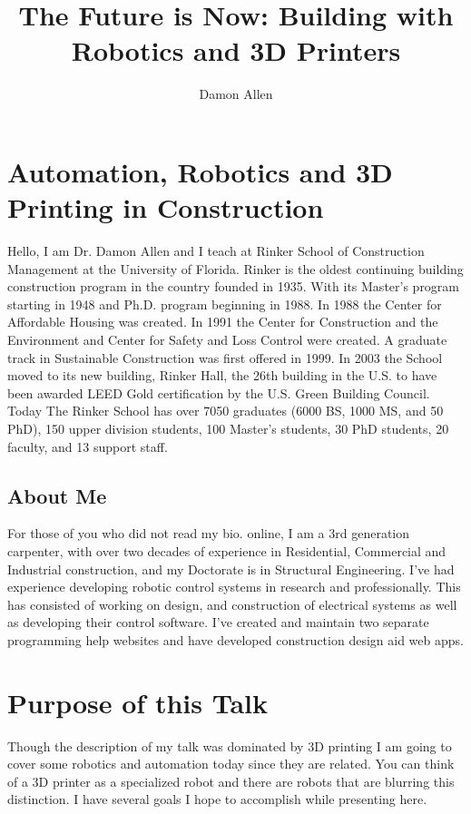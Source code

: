 \documentclass[12pt]{article}
\title{The Future is Now: Building with Robotics and 3D Printers}
\author{Damon Allen}
\begin{document}
\maketitle
\section{ Automation, Robotics and 3D Printing in Construction }
Hello, I am Dr. Damon Allen and I teach at Rinker School of Construction Management at the University of Florida.  Rinker is the oldest continuing building construction program in the country founded in 1935.   With its Master's program starting in 1948 and Ph.D. program beginning in 1988.  In 1988 the Center for Affordable Housing was created.  In 1991 the Center for Construction and the Environment and Center for Safety and Loss Control were created.  A graduate track in Sustainable Construction was first offered in 1999.  In 2003 the School moved to its new building, Rinker Hall, the 26th building in the U.S. to have been awarded LEED Gold certification by the U.S. Green Building Council.  Today The Rinker School has over 7050 graduates (6000 BS, 1000 MS, and 50 PhD), 150 upper division students, 100 Master’s students, 30 PhD students, 20 faculty, and 13 support staff.
\subsection{About Me}
For those of you who did not read my bio. online, I am a 3rd generation carpenter, with over two decades of experience in Residential, Commercial and Industrial construction, and my Doctorate is in Structural Engineering.  I've had experience developing robotic control systems in research and professionally.  This has consisted of working on design, and construction of electrical systems as well as developing their control software.  I've created and maintain two separate programming help websites and have developed construction design aid web apps.
\section{Purpose of this Talk}
Though the description of my talk was dominated by 3D printing I am going to cover some robotics and automation today since they are related.  You can think of a 3D printer as a specialized robot and there are robots that are blurring this distinction.  I have several goals I hope to accomplish while presenting here.
\end{document}
